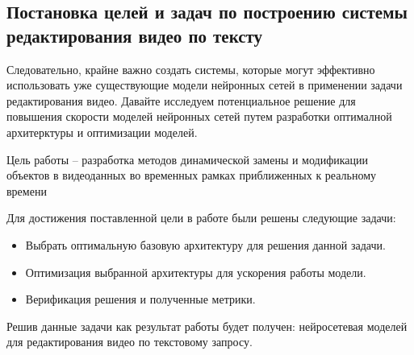 \subsection{Постановка целей и задач по построению системы редактирования видео по тексту}

Следовательно, крайне важно создать системы, которые могут эффективно использовать уже существующие модели нейронных сетей в применении задачи редактирования видео. Давайте исследуем потенциальное решение для повышения скорости моделей нейронных сетей путем разработки оптималной архитерктуры и оптимизации моделей.

Цель работы – разработка методов динамической замены и модификации объектов в видеоданных во временных рамках приближенных к реальному времени

Для достижения поставленной цели в работе были решены следующие задачи:
\begin{itemize}
    \item Выбрать оптимальную базовую архитектуру для решения данной задачи.
    \item Оптимизация выбранной архитектуры для ускорения работы модели.
    \item Верификация решения и полученные метрики.
\end{itemize}

Решив данные задачи как результат работы будет получен: нейросетевая моделей для редактирования видео по текстовому запросу.
